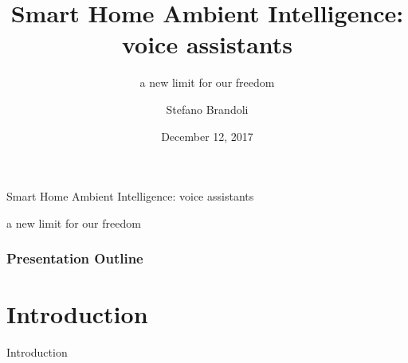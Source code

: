 \documentclass{beamer}
\title{Smart Home Ambient Intelligence: \\voice assistants}
\subtitle{\vspace*{0.3cm}a new limit for our freedom}
\author[Stefano Brandoli]{Stefano Brandoli}
\institute[PoliMi]{Politecnico di Milano\\Computer Ethics 2017/2018}
\date{December 12, 2017}
\begin{document}
\begin{frame}
\maketitle
\end{frame}

\begin{frame}
\begin{center}\vspace*{-0.5cm}Smart Home Ambient Intelligence: voice assistants
	
a new limit for our freedom
\end{center}
\frametitle{Presentation Outline}
\tableofcontents
\end{frame}

\section{Introduction}

\begin{frame}
\begin{center}
	 Introduction
\end{center}
\end{frame}
\end{document}
